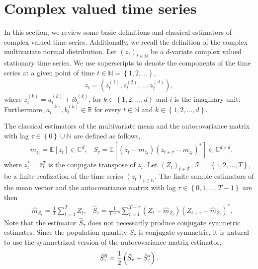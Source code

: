 \documentclass[11pt,a4paper,leqno]{amsart}
\newcommand{\C}{\mathbb{C}}
\newcommand{\1}{\mathbbm{1}}
\newcommand{\sym}{\textnormal{S}}
\newcommand{\N}{\mathbb{N}}
\newcommand{\E}{\mathbb{E}}
\newcommand{\T}{\mathcal{T}}
\newcommand{\0}{\mathbf{0}}
\newcommand{\R}{\mathbb{R}}
\begin{document}
\section{Complex valued time series}
\label{sec:ctimeseries}
In this section, we review some basic definitions and classical estimators of complex valued time series. Additionally, we recall the definition of the complex multivariate normal distribution. 
Let $\left(z_t\right)_{t\in \N}$ be a $d$-variate complex valued stationary  time series.   We  use superscripts to denote the components of the time series at a given point of time $t \in \N = \left\{1,2,\ldots\right\}$,
\begin{align*}
z_t = \left( z_t^{(1)}, z_t^{(2)},\ldots, z_t^{(d)} \right),
\end{align*}
where $z_t^{(k)} = a_t^{(k)} + ib_t^{(k)} $, for $k \in \left\{1,2,\ldots,d\right\}$ and $i$ is the imaginary unit. Furthermore, $a_t^{(k)}, b_t^{(k)} \in \R$ for every $t \in \N$ and $k \in \left\{1,2,\ldots,d\right\}$. 



The classical estimators of the multivariate mean and the autocovariance matrix with lag $\tau \in \left\{0\right\} \cup \N $ are defined as follows,
\begin{align*}
&m_{z_t} = \E\left[z_t\right]\in \C^d, &S_{\tau} = \E\left[\left(z_t - m_{z_t} \right)\left( z_{t+\tau} - m_{z_t}\right)^*\right]\in \C^{d\times d},
\end{align*}
where $z_t^* = \bar{z}_t^T$ is the conjugate transpose of $z_t$.  Let $ \left(Z_t \right)_{t\in \T}$, $\T = \left\{ 1,2,\ldots, T\right\}$, be a finite realization of the time series $\left(z_t\right)_{t\in \N}$.  The finite sample estimators of the mean vector and the autocovariance matrix with lag $\tau \in \left\{0,1,\ldots,T-1\right\}$ are then
\begin{align*}
& \hat{m}_{Z_t} = \frac{1}{T}\sum_{t=1}^T Z_t,
&\hat{S}_{\tau} = \frac{1}{T-\tau}\sum_{t=1}^{T-\tau} \left(Z_t -  \hat{m}_{Z_t}\right)\left(Z_{t+\tau}-\hat{m}_{Z_t}\right)^*.
\end{align*}
Note that the estimator $\hat{S}_\tau$ does not necessarily produce conjugate symmetric estimates. Since the population quantity $S_\tau$ is conjugate symmetric, it is natural to use the symmetrized version of the autocovariance matrix estimator,
\begin{align*}
\hat{S}^\sym_\tau = \frac{1}{2} \left(\hat{S}_\tau + \hat{S}_\tau^* \right).
\end{align*}
\end{document}
